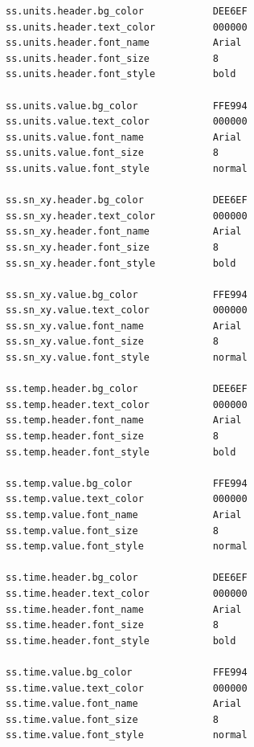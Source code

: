 \documentclass[letterpaper]{article}
\begin{document}
\begin{verbatim}
ss.units.header.bg_color            DEE6EF
ss.units.header.text_color          000000
ss.units.header.font_name           Arial
ss.units.header.font_size           8
ss.units.header.font_style          bold

ss.units.value.bg_color             FFE994
ss.units.value.text_color           000000
ss.units.value.font_name            Arial
ss.units.value.font_size            8
ss.units.value.font_style           normal

ss.sn_xy.header.bg_color            DEE6EF
ss.sn_xy.header.text_color          000000
ss.sn_xy.header.font_name           Arial
ss.sn_xy.header.font_size           8
ss.sn_xy.header.font_style          bold

ss.sn_xy.value.bg_color             FFE994
ss.sn_xy.value.text_color           000000
ss.sn_xy.value.font_name            Arial
ss.sn_xy.value.font_size            8
ss.sn_xy.value.font_style           normal

ss.temp.header.bg_color             DEE6EF
ss.temp.header.text_color           000000
ss.temp.header.font_name            Arial
ss.temp.header.font_size            8
ss.temp.header.font_style           bold

ss.temp.value.bg_color              FFE994
ss.temp.value.text_color            000000
ss.temp.value.font_name             Arial
ss.temp.value.font_size             8
ss.temp.value.font_style            normal

ss.time.header.bg_color             DEE6EF
ss.time.header.text_color           000000
ss.time.header.font_name            Arial
ss.time.header.font_size            8
ss.time.header.font_style           bold

ss.time.value.bg_color              FFE994
ss.time.value.text_color            000000
ss.time.value.font_name             Arial
ss.time.value.font_size             8
ss.time.value.font_style            normal
\end{verbatim}
\clearpage
\end{document}
